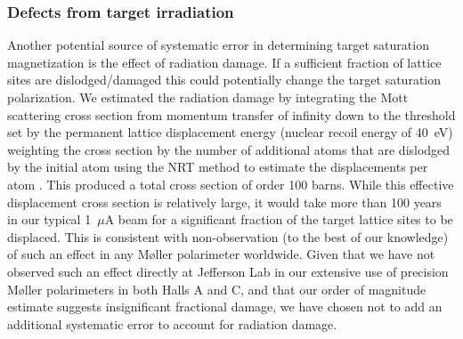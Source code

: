 \documentclass[preprint,12pt]{elsarticle}
\begin{document}
\subsubsection{Defects from target irradiation}
Another potential source of systematic error in determining target saturation magnetization is the effect of radiation damage. If a sufficient fraction of lattice sites are dislodged/damaged this could potentially change the target saturation polarization. We estimated the radiation damage by integrating the Mott scattering cross section from momentum transfer of infinity down to the threshold set by the permanent lattice displacement energy (nuclear recoil energy of 40~eV) weighting the cross section by the number of additional atoms that are dislodged by the initial atom using the NRT method to estimate the displacements per atom \cite{Norgett1975}. This produced a total cross section of order 100 barns. While this effective displacement cross section is relatively large, it would take more than 100 years in our typical 1~$\mu$A beam for a significant fraction of the target lattice sites to be displaced. This is consistent with non-observation (to the best of our knowledge) of such an effect in any M\o ller polarimeter worldwide. Given that we have not observed such an effect directly at Jefferson Lab in our extensive use of precision M\o ller polarimeters in both Halls A and C, and that our order of magnitude  estimate suggests insignificant fractional damage, we have chosen not to add an additional systematic error to account for radiation damage.
\end{document}
